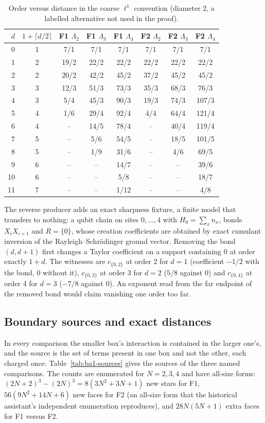 \begin{table}[htbp]
\centering\small
\caption{Order versus distance in the coarse $\ell^1$ convention (diameter 2,
a labelled alternative not used in the proof).}
\label{tab:ba1-order-one}
\begin{tabular}{rc cccccc}
\toprule
$d$ & $1+\lceil d/2\rceil$ & F1 $\Lambda_2$ & F1 $\Lambda_3$ & F1 $\Lambda_4$ & F2 $\Lambda_2$ & F2 $\Lambda_3$ & F2 $\Lambda_4$\\
\midrule
0 & 1 & 7/1 & 7/1 & 7/1 & 7/1 & 7/1 & 7/1\\
1 & 2 & 19/2 & 22/2 & 22/2 & 22/2 & 22/2 & 22/2\\
2 & 2 & 20/2 & 42/2 & 45/2 & 37/2 & 45/2 & 45/2\\
3 & 3 & 12/3 & 51/3 & 73/3 & 35/3 & 68/3 & 76/3\\
4 & 3 & 5/4 & 45/3 & 90/3 & 19/3 & 74/3 & 107/3\\
5 & 4 & 1/6 & 29/4 & 92/4 & 4/4 & 64/4 & 121/4\\
6 & 4 & -- & 14/5 & 78/4 & -- & 40/4 & 119/4\\
7 & 5 & -- & 5/6 & 54/5 & -- & 18/5 & 101/5\\
8 & 5 & -- & 1/9 & 31/6 & -- & 4/6 & 69/5\\
9 & 6 & -- & -- & 14/7 & -- & -- & 39/6\\
10 & 6 & -- & -- & 5/8 & -- & -- & 18/7\\
11 & 7 & -- & -- & 1/12 & -- & -- & 4/8\\
\bottomrule
\end{tabular}
\end{table}

The reverse producer adds an exact sharpness fixture, a finite model that
transfers to nothing: a qubit chain on sites $0,\ldots,4$ with
$H_0=\sum_xn_x$, bonds $X_iX_{i+1}$ and $R=\{0\}$, whose creation
coefficients are obtained by exact cumulant inversion of the
Rayleigh--Schr\"odinger ground vector. Removing the bond $(d,d+1)$ first
changes a Taylor coefficient on a support containing $0$ at order exactly
$1+d$. The witnesses are $c_{\{0,2\}}$ at order 2 for $d=1$ (coefficient
$-1/2$ with the bond, $0$ without it), $c_{\{0,3\}}$ at order 3 for $d=2$
($5/8$ against $0$) and $c_{\{0,4\}}$ at order 4 for $d=3$ ($-7/8$ against
$0$). An exponent read from the far endpoint of the removed bond would claim
vanishing one order too far.

\subsection{Boundary sources and exact distances}
\label{sec:ba1-sources}
In every comparison the smaller box's interaction is contained in the larger
one's, and the source is the set of terms present in one box and not the
other, each charged once. Table~\ref{tab:ba1-sources} gives the sources of
the three named comparisons. The counts are enumerated for $N=2,3,4$ and have
all-size forms: $(2N+2)^3-(2N)^3=8(3N^2+3N+1)$ new stars for F1,
$56(9N^2+14N+6)$ new faces for F2 (an all-size form that the historical
assistant's independent enumeration reproduces), and $28N(5N+1)$ extra faces
for F1 versus F2.

